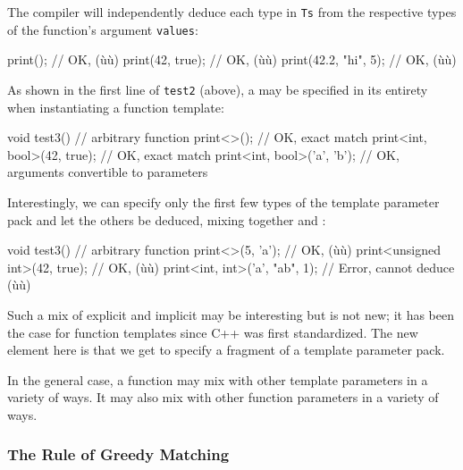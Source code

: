 \noindent The compiler will independently deduce each type in \lstinline!Ts! from the
respective types of the function's argument \lstinline!values!:

\begin{emcppslisting}
print();               // OK, (ù{}ù)
print(42, true);       // OK, (ù{}ù)
print(42.2, "hi", 5);  // OK, (ù{}ù)
\end{emcppslisting}
    

\noindent As shown in the first line of \lstinline!test2! (above), a  may be specified in its entirety when instantiating a
function template:

\begin{emcppslisting}
void test3()            // arbitrary function
{
    print<>();                    // OK, exact match
    print<int, bool>(42, true);   // OK, exact match
    print<int, bool>('a', 'b');   // OK, arguments convertible to parameters
}
\end{emcppslisting}
    

\noindent Interestingly, we can specify only the first few types of the template
parameter pack and let the others be deduced, mixing together
 and :

\begin{emcppslisting}
void test3()                         // arbitrary function
{
    print<>(5, 'a');                 // OK, (ù{}ù)
    print<unsigned int>(42, true);   // OK, (ù{}ù)
    print<int, int>('a', "ab", 1);   // Error, cannot deduce (ù{}ù)
}
\end{emcppslisting}
    

\noindent Such a mix of explicit and implicit may be interesting but is not new;
it has been the case for function templates since C++ was first
standardized. The new element here is that we get to specify a fragment
of a template parameter pack.

In the general case, a function may mix  with other template parameters in a variety of ways. It may also
mix  with other function parameters in
a variety of ways.

\subsubsection[The Rule of Greedy Matching]{The Rule of Greedy Matching}\label{the-rule-of-greedy-matching}

